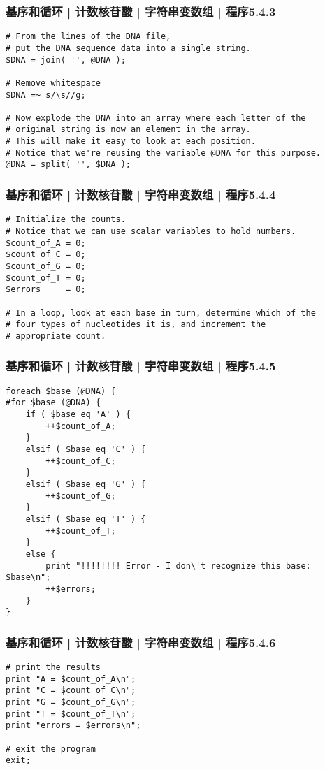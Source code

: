 \begin{frame}[fragile]
  \frametitle{基序和循环 | 计数核苷酸 | 字符串变数组 | 程序5.4.3}
\begin{lstlisting}[firstnumber=26,basicstyle=\small\tt]
# From the lines of the DNA file,
# put the DNA sequence data into a single string.
$DNA = join( '', @DNA );

# Remove whitespace
$DNA =~ s/\s//g;

# Now explode the DNA into an array where each letter of the
# original string is now an element in the array.
# This will make it easy to look at each position.
# Notice that we're reusing the variable @DNA for this purpose.
@DNA = split( '', $DNA );
\end{lstlisting}
\end{frame}

\begin{frame}[fragile]
  \frametitle{基序和循环 | 计数核苷酸 | 字符串变数组 | 程序5.4.4}
\begin{lstlisting}[firstnumber=39]
# Initialize the counts.
# Notice that we can use scalar variables to hold numbers.
$count_of_A = 0;
$count_of_C = 0;
$count_of_G = 0;
$count_of_T = 0;
$errors     = 0;

# In a loop, look at each base in turn, determine which of the
# four types of nucleotides it is, and increment the
# appropriate count.
\end{lstlisting}
\end{frame}

\begin{frame}[fragile]
  \frametitle{基序和循环 | 计数核苷酸 | 字符串变数组 | 程序5.4.5}
  \vspace{-0.8em}
\begin{lstlisting}[firstnumber=50,basicstyle=\footnotesize\tt,numberstyle=\scriptsize]
foreach $base (@DNA) {
#for $base (@DNA) {
    if ( $base eq 'A' ) {
        ++$count_of_A;
    }
    elsif ( $base eq 'C' ) {
        ++$count_of_C;
    }
    elsif ( $base eq 'G' ) {
        ++$count_of_G;
    }
    elsif ( $base eq 'T' ) {
        ++$count_of_T;
    }
    else {
        print "!!!!!!!! Error - I don\'t recognize this base: $base\n";
        ++$errors;
    }
}
\end{lstlisting}
\end{frame}

\begin{frame}[fragile]
  \frametitle{基序和循环 | 计数核苷酸 | 字符串变数组 | 程序5.4.6}
\begin{lstlisting}[firstnumber=70]
# print the results
print "A = $count_of_A\n";
print "C = $count_of_C\n";
print "G = $count_of_G\n";
print "T = $count_of_T\n";
print "errors = $errors\n";

# exit the program
exit;
\end{lstlisting}
\end{frame}


